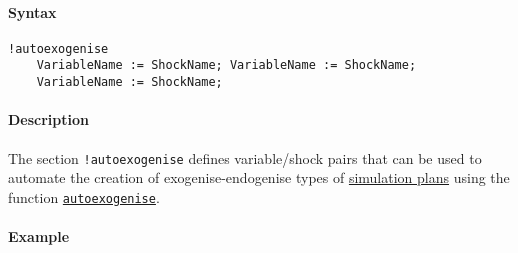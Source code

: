 


	\paragraph{Syntax}\label{syntax}

\begin{verbatim}
!autoexogenise
    VariableName := ShockName; VariableName := ShockName;
    VariableName := ShockName;
\end{verbatim}

\paragraph{Description}\label{description}

The section \texttt{!autoexogenise} defines variable/shock pairs that
can be used to automate the creation of exogenise-endogenise types of
\href{plan/Contents}{simulation plans} using the function
\href{plan/autoexogenise}{\texttt{autoexogenise}}.

\paragraph{Example}\label{example}



